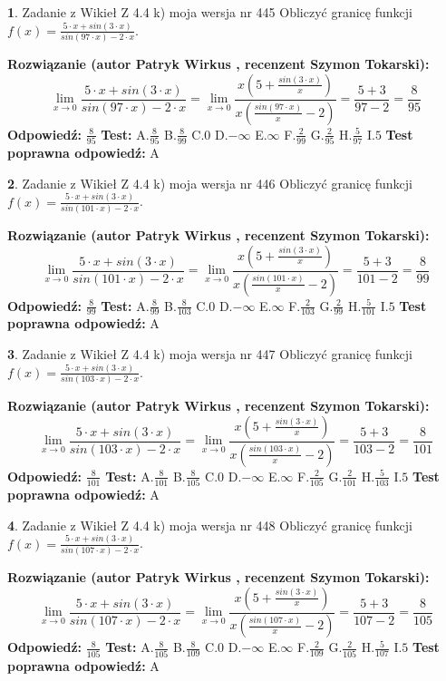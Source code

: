 \documentclass[12pt, a4paper]{article}
\theoremstyle{definition} %
\newtheorem{zad}{}
\newcommand{\zadStart}[1]{\begin{zad}#1\newline}
\newcommand{\zadStop}{\end{zad}}
\newcommand{\rozwStart}[2]{\noindent \textbf{Rozwiązanie (autor #1 , recenzent #2): }\newline}
\newcommand{\rozwStop}{\newline}
\newcommand{\odpStart}{\noindent \textbf{Odpowiedź:}\newline}
\newcommand{\odpStop}{\newline}
\newcommand{\testStart}{\noindent \textbf{Test:}\newline}
\newcommand{\testStop}{\newline}
\newcommand{\kluczStart}{\noindent \textbf{Test poprawna odpowiedź:}\newline}
\newcommand{\kluczStop}{\newline}
\begin{document}
\zadStart{Zadanie z Wikieł Z 4.4 k) moja wersja nr 445}
Obliczyć granicę funkcji $f(x)=\frac{5\cdot x +sin(3\cdot x)}{sin(97\cdot x) -2\cdot x}$.
\zadStop
\rozwStart{Patryk Wirkus}{Szymon Tokarski}
$$\lim\limits_{x\to 0}\frac{5\cdot x +sin(3\cdot x)}{sin(97\cdot x) -2\cdot x}
=\lim\limits_{x\to 0}\frac{x(5+\frac{sin(3\cdot x)}{x})}{x(\frac{sin(97\cdot x)}{x}-2)}
=\frac{5+3}{97-2} = \frac{8}{95}$$
\rozwStop
\odpStart
$\frac{8}{95}$
\odpStop
\testStart
A.$\frac{8}{95}$
B.$\frac{8}{99}$
C.$0$
D.$-\infty$
E.$\infty$
F.$\frac{2}{99}$
G.$\frac{2}{95}$
H.$\frac{5}{97}$
I.$5$
\testStop
\kluczStart
A
\kluczStop



\zadStart{Zadanie z Wikieł Z 4.4 k) moja wersja nr 446}
Obliczyć granicę funkcji $f(x)=\frac{5\cdot x +sin(3\cdot x)}{sin(101\cdot x) -2\cdot x}$.
\zadStop
\rozwStart{Patryk Wirkus}{Szymon Tokarski}
$$\lim\limits_{x\to 0}\frac{5\cdot x +sin(3\cdot x)}{sin(101\cdot x) -2\cdot x}
=\lim\limits_{x\to 0}\frac{x(5+\frac{sin(3\cdot x)}{x})}{x(\frac{sin(101\cdot x)}{x}-2)}
=\frac{5+3}{101-2} = \frac{8}{99}$$
\rozwStop
\odpStart
$\frac{8}{99}$
\odpStop
\testStart
A.$\frac{8}{99}$
B.$\frac{8}{103}$
C.$0$
D.$-\infty$
E.$\infty$
F.$\frac{2}{103}$
G.$\frac{2}{99}$
H.$\frac{5}{101}$
I.$5$
\testStop
\kluczStart
A
\kluczStop



\zadStart{Zadanie z Wikieł Z 4.4 k) moja wersja nr 447}
Obliczyć granicę funkcji $f(x)=\frac{5\cdot x +sin(3\cdot x)}{sin(103\cdot x) -2\cdot x}$.
\zadStop
\rozwStart{Patryk Wirkus}{Szymon Tokarski}
$$\lim\limits_{x\to 0}\frac{5\cdot x +sin(3\cdot x)}{sin(103\cdot x) -2\cdot x}
=\lim\limits_{x\to 0}\frac{x(5+\frac{sin(3\cdot x)}{x})}{x(\frac{sin(103\cdot x)}{x}-2)}
=\frac{5+3}{103-2} = \frac{8}{101}$$
\rozwStop
\odpStart
$\frac{8}{101}$
\odpStop
\testStart
A.$\frac{8}{101}$
B.$\frac{8}{105}$
C.$0$
D.$-\infty$
E.$\infty$
F.$\frac{2}{105}$
G.$\frac{2}{101}$
H.$\frac{5}{103}$
I.$5$
\testStop
\kluczStart
A
\kluczStop



\zadStart{Zadanie z Wikieł Z 4.4 k) moja wersja nr 448}
Obliczyć granicę funkcji $f(x)=\frac{5\cdot x +sin(3\cdot x)}{sin(107\cdot x) -2\cdot x}$.
\zadStop
\rozwStart{Patryk Wirkus}{Szymon Tokarski}
$$\lim\limits_{x\to 0}\frac{5\cdot x +sin(3\cdot x)}{sin(107\cdot x) -2\cdot x}
=\lim\limits_{x\to 0}\frac{x(5+\frac{sin(3\cdot x)}{x})}{x(\frac{sin(107\cdot x)}{x}-2)}
=\frac{5+3}{107-2} = \frac{8}{105}$$
\rozwStop
\odpStart
$\frac{8}{105}$
\odpStop
\testStart
A.$\frac{8}{105}$
B.$\frac{8}{109}$
C.$0$
D.$-\infty$
E.$\infty$
F.$\frac{2}{109}$
G.$\frac{2}{105}$
H.$\frac{5}{107}$
I.$5$
\testStop
\kluczStart
A
\kluczStop
\end{document}
